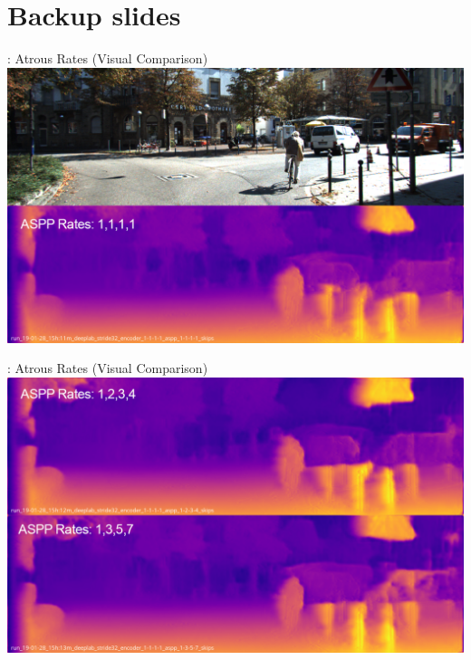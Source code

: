 \section*{Backup slides}
\begin{frame}[c]{\subsecname: Atrous Rates (Visual Comparison)}
  \centering
  \includegraphics[width=1.0\textwidth]{figures/images/asppcomparison_001.png}
\end{frame}

\begin{frame}[c]{\subsecname: Atrous Rates (Visual Comparison)}
  \centering
  \includegraphics[width=1.0\textwidth]{figures/images/asppcomparison_002.png}
\end{frame}

